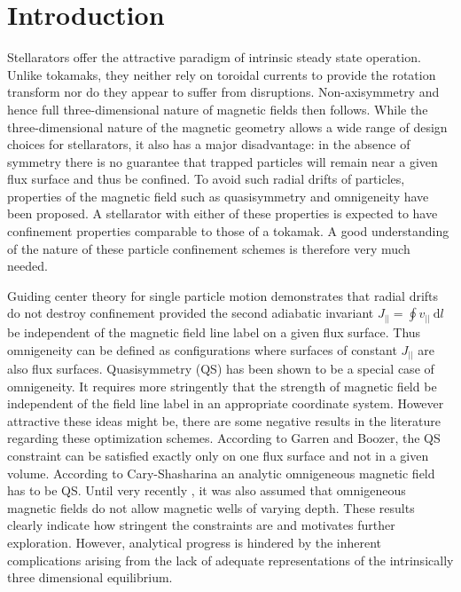 \documentclass[aip,pop,reprint]{revtex4-1}
\newcommand*{\vpl}{v_{||}}
\newcommand*{\Jpl}{J_{||}}
\newcommand*{\dtl}{\mathrm{d}l}
\begin{document}
\section{Introduction}
Stellarators offer the attractive paradigm of intrinsic steady state operation. Unlike tokamaks, they neither rely on toroidal currents to provide the rotation transform nor do they appear to suffer from disruptions. Non-axisymmetry and hence full three-dimensional nature of magnetic fields then follows. While the three-dimensional nature of the magnetic geometry allows a wide range of design choices for stellarators, it also has a major disadvantage: in the absence of symmetry there is no guarantee that trapped particles will remain near a given flux surface and thus be confined. To avoid such radial drifts of particles, properties of the magnetic field such as quasisymmetry \cite{nuhrenberg1988quasi,boozer1995quasi} and omnigeneity \cite{hall1975three,caryshashrinaPRL1997helical} have been proposed. A stellarator with either of these properties is expected to have confinement properties comparable to those of a tokamak. A good understanding of the nature of these particle confinement schemes is therefore very much needed. 
  
Guiding center theory for single particle motion demonstrates that radial drifts do not destroy confinement provided the second adiabatic invariant $\Jpl=\oint \vpl\:\dtl $ be independent of the magnetic field line label on a given flux surface. Thus omnigeneity can be defined as configurations where surfaces of constant $\Jpl$ are also flux surfaces. Quasisymmetry (QS) has been shown \cite{landremancatto2012omnigenity} to be a special case of omnigeneity. It requires more stringently that the strength of magnetic field be independent of the field line label in an appropriate coordinate system.
However attractive these ideas might be, there are some negative results in the literature regarding these optimization schemes. According to Garren\cite{garrenBoozer1991existence} and Boozer, the QS constraint can be satisfied exactly only on one flux surface and not in a given volume. According to Cary-Shasharina\cite{caryshashrinaPRL1997helical,caryshasharina1997omnigenity} an analytic omnigeneous magnetic field has to be QS. Until very recently \cite{parraLandreman2015lessconstrained}, it was also assumed  \cite{caryshasharina1997omnigenity,landremancatto2012omnigenity} that omnigeneous magnetic fields do not allow magnetic wells of varying depth. These results clearly indicate how stringent the constraints are and motivates further exploration. However, analytical progress is hindered by the inherent complications arising from the lack of adequate representations of the intrinsically three dimensional equilibrium.
\end{document}
